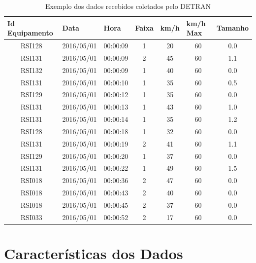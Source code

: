 \begin{table}[h]
    \begin{tabular}{ccccccc}
    \toprule
    \multicolumn{1}{l}{\textbf{Id Equipamento}} & \multicolumn{1}{l}{\textbf{Data}} & \multicolumn{1}{l}{\textbf{Hora}} & \multicolumn{1}{l}{\textbf{Faixa}} & \multicolumn{1}{l}{\textbf{km/h}} & \multicolumn{1}{l}{\textbf{km/h Max}} & \multicolumn{1}{l}{\textbf{Tamanho}} \\ 
    \midrule
        RSI128 & 2016/05/01 & 00:00:09 & 1 & 20 & 60 & 0.0 \\
    \midrule
    RSI131 & 2016/05/01 & 00:00:09 & 2 & 45 & 60 & 1.1 \\
    \midrule
    RSI132 & 2016/05/01 & 00:00:09 & 1 & 40 & 60 & 0.0 \\
    \midrule
    RSI131 & 2016/05/01 & 00:00:10 & 1 & 35 & 60 & 0.5 \\
    \midrule 
    RSI129 & 2016/05/01 & 00:00:12 & 1 & 35 & 60 & 0.0 \\
    \midrule
    RSI131 & 2016/05/01 & 00:00:13 & 1 & 43 & 60 & 1.0 \\
    \midrule
    RSI131 & 2016/05/01 & 00:00:14 & 1 & 35 & 60 & 1.2 \\
    \midrule
    RSI128 & 2016/05/01 & 00:00:18 & 1 & 32 & 60 & 0.0 \\
    \midrule
    RSI131 & 2016/05/01 & 00:00:19 & 2 & 41 & 60 & 1.1 \\
    \midrule
    RSI129 & 2016/05/01 & 00:00:20 & 1 & 37 & 60 & 0.0 \\
    \midrule
    RSI131 & 2016/05/01 & 00:00:22 & 1 & 49 & 60 & 1.5 \\
    \midrule
    RSI018 & 2016/05/01 & 00:00:36 & 2 & 47 & 60 & 0.0 \\
    \midrule
    RSI018 & 2016/05/01 & 00:00:43 & 2 & 40 & 60 & 0.0 \\
    \midrule
    RSI018 & 2016/05/01 & 00:00:45 & 2 & 37 & 60 & 0.0 \\
    \midrule
    RSI033 & 2016/05/01 & 00:00:52 & 2 & 17 & 60 & 0.0 \\
    \bottomrule
    \end{tabular}
    \label{table:data}
    \caption{Exemplo dos dados recebidos coletados pelo \acrshort{DETRAN}}
\end{table}

\section{Características dos Dados}

